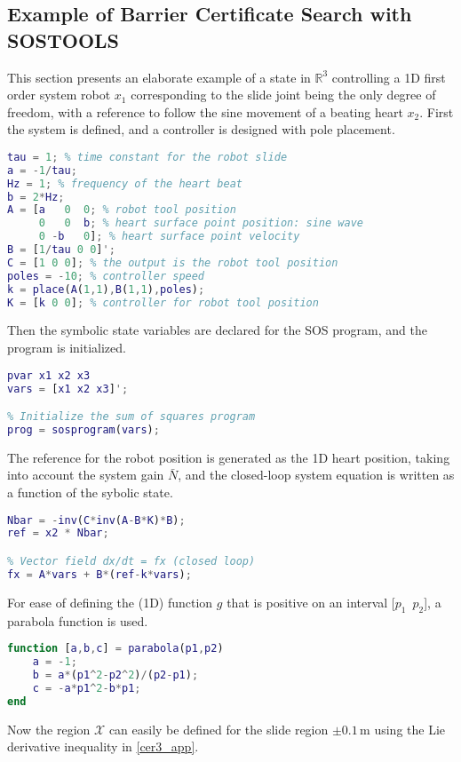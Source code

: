 \subsection{Example of Barrier Certificate Search with SOSTOOLS}
This section presents an elaborate example of a state in $\mathbb{R}^3$ controlling a 1D first order system robot $x_1$ corresponding to the slide joint being the only degree of freedom, with a reference to follow the sine movement of a beating heart $x_2$. First the system is defined, and a controller is designed with pole placement.
\begin{lstlisting}[language=matlab]
% Define state-space system with x1 = robot position, x2 = heart position, x3 = heart velocity
tau = 1; % time constant for the robot slide
a = -1/tau;
Hz = 1; % frequency of the heart beat
b = 2*Hz;
A = [a   0  0; % robot tool position
     0   0  b; % heart surface point position: sine wave
     0 -b   0]; % heart surface point velocity
B = [1/tau 0 0]';
C = [1 0 0]; % the output is the robot tool position
poles = -10; % controller speed
k = place(A(1,1),B(1,1),poles);
K = [k 0 0]; % controller for robot tool position
\end{lstlisting}
Then the symbolic state variables are declared for the SOS program, and the program is initialized.
\begin{lstlisting}[language=matlab]
% Declare state variables
pvar x1 x2 x3
vars = [x1 x2 x3]';

% Initialize the sum of squares program
prog = sosprogram(vars);
\end{lstlisting}
The reference for the robot position is generated as the 1D heart position, taking into account the system gain $\bar{N}$, and the closed-loop system equation is written as a function of the sybolic state. %
\begin{lstlisting}[language=matlab]
% Reference signal for robot position: the heart position
Nbar = -inv(C*inv(A-B*K)*B);
ref = x2 * Nbar;

% Vector field dx/dt = fx (closed loop)
fx = A*vars + B*(ref-k*vars);
\end{lstlisting}
For ease of defining the (1D) function $g$ that is positive on an interval [$p_1\,\,\, p_2$], a parabola function is used.
\begin{lstlisting}[language=matlab]
function [a,b,c] = parabola(p1,p2)
	a = -1;
	b = a*(p1^2-p2^2)/(p2-p1);
	c = -a*p1^2-b*p1;
end
\end{lstlisting}
Now the region $\mathcal{X}$ can easily be defined for the slide region $\pm0.1$\,m using the Lie derivative inequality in \autoref{cer3_app}. 

